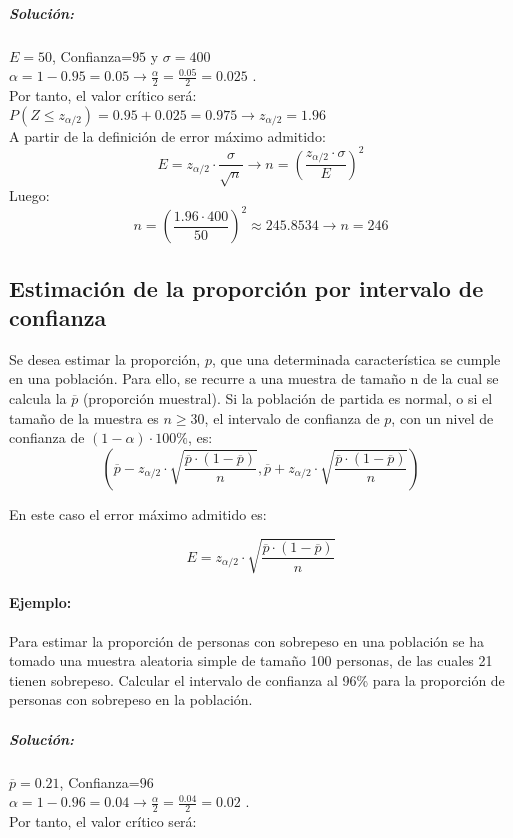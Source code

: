 \subparagraph{Solución:}$E=50$, Confianza=$95$ y $\sigma=400$ \\
$\alpha=1-0.95=0.05 \to \frac{\alpha}{2}=\frac{0.05}{2}=0.025$
. \\ Por tanto, el valor crítico será: \\
$P\left(Z \leqslant z_{\alpha / 2} \right)= 0.95 + 0.025 = 0.975 \to z_{\alpha / 2} = 1.96$\\ A partir de la definición de error máximo admitido:
$$E=z_{\alpha / 2}\cdot \frac{\sigma}{\sqrt{n}} \to 
n = \left( \frac{z_{\alpha / 2} \cdot \sigma}{E} \right) ^ 2$$
Luego: \\
$$n = \left( \frac{1.96 \cdot 400}{50} \right) ^ 2\approx 245.8534 \to n=246
$$

\subsection{Estimación de la proporción por intervalo de confianza} Se desea estimar la proporción, $p$, que una determinada característica se cumple en una población.
Para ello, se recurre a una muestra de tamaño n de la cual se calcula la 
$\overline{p}$ (proporción muestral).
Si la población de partida es normal, o si el tamaño de la muestra es $n \geqslant 30 $, el intervalo de confianza de $p$, con un nivel de confianza de $\left( 1 - \alpha \right)\cdot 100 \% $, es: $$ \left( \overline{p} - z_{\alpha / 2}\cdot \sqrt{\frac{\overline{p}\cdot\left(1-\overline{p} \right)}{n}} ,  \overline{p} + z_{\alpha / 2}\cdot \sqrt{\frac{\overline{p}\cdot\left(1-\overline{p} \right)}{n}}\right)$$

En este caso el error máximo admitido es:

$$E=z_{\alpha / 2}\cdot \sqrt{\frac{\overline{p}\cdot\left(1-\overline{p} \right)}{n}}$$

\paragraph{Ejemplo:} Para estimar la proporción de personas con sobrepeso en una población se ha tomado una
muestra aleatoria simple de tamaño 100 personas, de las cuales 21 tienen sobrepeso. Calcular el intervalo
de confianza al 96\% para la proporción de personas con sobrepeso en la población.

\subparagraph{Solución:}$\overline{p}=0.21$, Confianza=$96$ \\
$\alpha=1-0.96=0.04 \to \frac{\alpha}{2}=\frac{0.04}{2}=0.02$
. \\ Por tanto, el valor crítico será: \\

